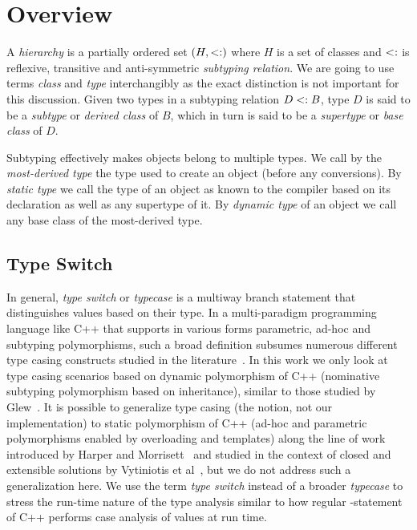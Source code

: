 \section{Overview} %
\label{sec:over}

A \emph{hierarchy} is a partially ordered set $(H,<:)$ where $H$ is a set 
of classes and $<:$ is reflexive, transitive and anti-symmetric 
\emph{subtyping relation}. We are going to use terms \emph{class} and \emph{type} 
interchangibly as the exact distinction is not important for this discussion. 
Given two types in a subtyping relation $D <: B$, type $D$ is said to be a 
\emph{subtype} or \emph{derived class} of $B$, which in turn is said to be a 
\emph{supertype} or \emph{base class} of $D$.

Subtyping effectively makes objects belong to multiple types. We call by the 
\emph{most-derived type} the type used to create an object (before any 
conversions). By \emph{static type} we call the type of an object as known to 
the compiler based on its declaration as well as any supertype of it. By 
\emph{dynamic type} of an object we call any base class of the most-derived type.

\subsection{Type Switch}

In general, \emph{type switch} or \emph{typecase} is a multiway branch statement 
that distinguishes values based on their type. In a multi-paradigm programming 
language like C++ that supports in various forms parametric, ad-hoc and 
subtyping polymorphisms, such a broad definition subsumes numerous different type 
casing constructs studied in the literature~\cite{Intensional95,Glew99,OpenShutTypecase05}. 
In this work we only look at type casing scenarios based on dynamic polymorphism 
of C++ (nominative subtyping polymorphism based on inheritance), similar to 
those studied by Glew~\cite{Glew99}. It is possible to generalize type casing 
(the notion, not our implementation) to static polymorphism of C++ (ad-hoc and 
parametric polymorphisms enabled by overloading and templates) along the line of 
work introduced by Harper and Morrisett~\cite{Intensional95} and studied in the
context of closed and extensible solutions by Vytiniotis et 
al~\cite{OpenShutTypecase05}, but we do not address such a generalization here. 
We use the term \emph{type switch} instead of a broader \emph{typecase} to 
stress the run-time nature of the type analysis similar to how regular 
-statement of C++ performs case analysis of values at run time.

